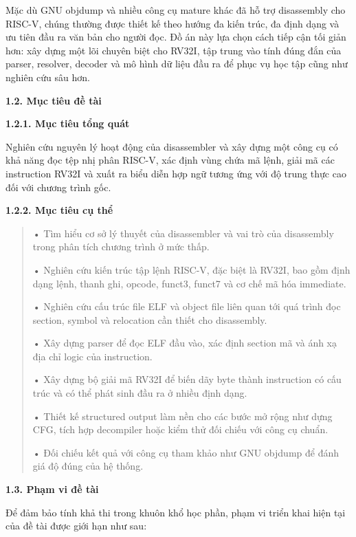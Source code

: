 \documentclass[
]{article}
\begin{document}
Mặc dù GNU objdump và nhiều công cụ mature khác đã hỗ trợ disassembly
cho RISC-V, chúng thường được thiết kế theo hướng đa kiến trúc, đa định
dạng và ưu tiên đầu ra văn bản cho người đọc. Đồ án này lựa chọn cách
tiếp cận tối giản hơn: xây dựng một lõi chuyên biệt cho RV32I, tập trung
vào tính đúng đắn của parser, resolver, decoder và mô hình dữ liệu đầu
ra để phục vụ học tập cũng như nghiên cứu sâu hơn.

\textbf{1.2. Mục tiêu đề tài}

\textbf{1.2.1. Mục tiêu tổng quát}

Nghiên cứu nguyên lý hoạt động của disassembler và xây dựng một công cụ
có khả năng đọc tệp nhị phân RISC-V, xác định vùng chứa mã lệnh, giải mã
các instruction RV32I và xuất ra biểu diễn hợp ngữ tương ứng với độ
trung thực cao đối với chương trình gốc.

\textbf{1.2.2. Mục tiêu cụ thể}

\begin{quote}
• Tìm hiểu cơ sở lý thuyết của disassembler và vai trò của disassembly
trong phân tích chương trình ở mức thấp.

• Nghiên cứu kiến trúc tập lệnh RISC-V, đặc biệt là RV32I, bao gồm định
dạng lệnh, thanh ghi, opcode, funct3, funct7 và cơ chế mã hóa immediate.

• Nghiên cứu cấu trúc file ELF và object file liên quan tới quá trình
đọc section, symbol và relocation cần thiết cho disassembly.

• Xây dựng parser để đọc ELF đầu vào, xác định section mã và ánh xạ địa
chỉ logic của instruction.

• Xây dựng bộ giải mã RV32I để biến dãy byte thành instruction có cấu
trúc và có thể phát sinh đầu ra ở nhiều định dạng.

• Thiết kế structured output làm nền cho các bước mở rộng như dựng CFG,
tích hợp decompiler hoặc kiểm thử đối chiếu với công cụ chuẩn.

• Đối chiếu kết quả với công cụ tham khảo như GNU objdump để đánh giá độ
đúng của hệ thống.
\end{quote}

\textbf{1.3. Phạm vi đề tài}

Để đảm bảo tính khả thi trong khuôn khổ học phần, phạm vi triển khai
hiện tại của đề tài được giới hạn như sau:
\end{document}
